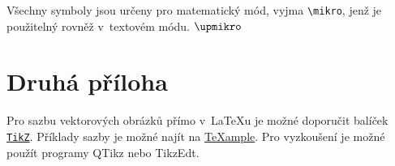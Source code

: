 Všechny symboly jsou určeny pro matematický mód, vyjma \verb|\mikro|, jenž je\\ použitelný rovněž v~textovém módu.
$\upmikro$


\chapter{Druhá příloha}

Pro sazbu vektorových obrázků přímo v~\LaTeX{}u je možné doporučit balíček \href{https://www.ctan.org/pkg/pgf}{\texttt{TikZ}}.
Příklady sazby je možné najít na \href{http://www.texample.net/tikz/examples/}{\TeX{}ample}.
Pro vyzkoušení je možné použít programy QTikz nebo TikzEdt.






%
%

%

